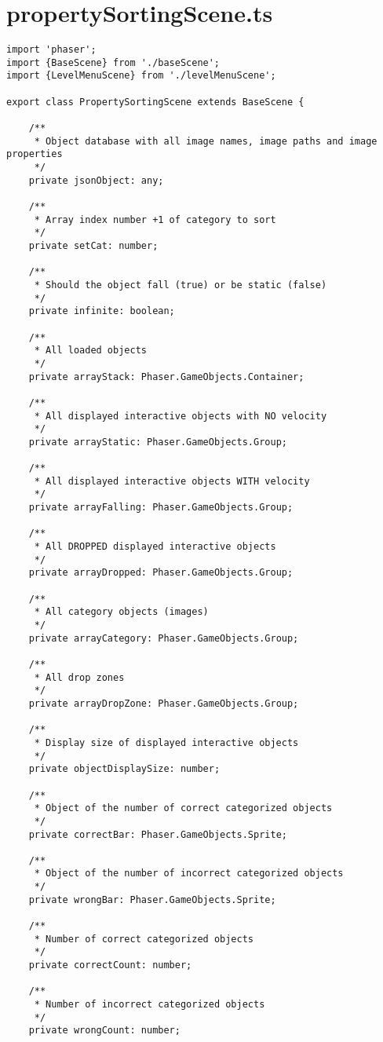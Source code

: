 \section{propertySortingScene.ts}\label{sec:propertysortingscene.ts}
\begin{lstlisting}[style=TypeScript, caption={propertySortingScene.ts}]
import 'phaser';
import {BaseScene} from './baseScene';
import {LevelMenuScene} from './levelMenuScene';

export class PropertySortingScene extends BaseScene {

    /**
     * Object database with all image names, image paths and image properties
     */
    private jsonObject: any;

    /**
     * Array index number +1 of category to sort
     */
    private setCat: number;

    /**
     * Should the object fall (true) or be static (false)
     */
    private infinite: boolean;

    /**
     * All loaded objects
     */
    private arrayStack: Phaser.GameObjects.Container;

    /**
     * All displayed interactive objects with NO velocity
     */
    private arrayStatic: Phaser.GameObjects.Group;

    /**
     * All displayed interactive objects WITH velocity
     */
    private arrayFalling: Phaser.GameObjects.Group;

    /**
     * All DROPPED displayed interactive objects
     */
    private arrayDropped: Phaser.GameObjects.Group;

    /**
     * All category objects (images)
     */
    private arrayCategory: Phaser.GameObjects.Group;

    /**
     * All drop zones
     */
    private arrayDropZone: Phaser.GameObjects.Group;

    /**
     * Display size of displayed interactive objects
     */
    private objectDisplaySize: number;

    /**
     * Object of the number of correct categorized objects
     */
    private correctBar: Phaser.GameObjects.Sprite;

    /**
     * Object of the number of incorrect categorized objects
     */
    private wrongBar: Phaser.GameObjects.Sprite;

    /**
     * Number of correct categorized objects
     */
    private correctCount: number;

    /**
     * Number of incorrect categorized objects
     */
    private wrongCount: number;


\end{lstlisting}
